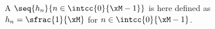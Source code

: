 

\begin{definition}
\label{def:lp_rect}
A  $\seq{h_n}{n\in\intcc{0}{\xM-1}}$ is here defined as 
\\\indentx$h_n=\sfrac{1}{\xM}$ for $n\in\intcc{0}{\xM-1}$.
\end{definition}

